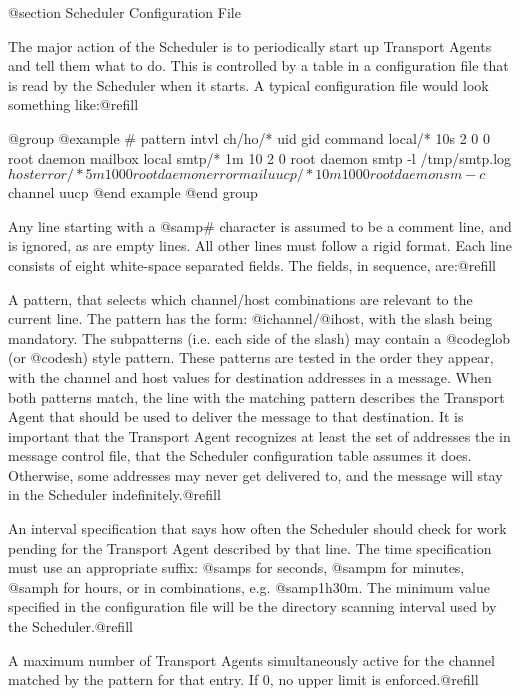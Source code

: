{{@section Scheduler Configuration File

The major action of the Scheduler is to periodically start up Transport
Agents and tell them what to do.  This is controlled by a table in a
configuration file that is read by the Scheduler when it starts.  A typical
configuration file would look something like:@refill

@group
@example
# pattern    intvl   ch/ho/* uid     gid     command
local/*      10s      2 0 0  root    daemon  mailbox local
smtp/*       1m      10 2 0  root    daemon  smtp -l /tmp/smtp.log $host
error/*      5m      10 0 0  root    daemon  errormail
uucp/*       10m     10 0 0  root    daemon  sm -c $channel uucp
@end example
@end group

Any line starting with a @samp{#} character is assumed to be a comment
line, and is ignored, as are empty lines.  All other lines must follow a
rigid format.  Each line consists of eight white-space separated fields.
The fields, in sequence, are:@refill

A pattern, that selects which channel/host combinations are relevant to the
current line.  The pattern has the form: @i{channel}/@i{host}, with the slash
being mandatory.  The subpatterns (i.e. each side of the slash) may contain a
@code{glob} (or @code{sh}) style pattern.  These patterns are tested in the
order they appear, with the channel and host values for destination addresses
in a message.  When both patterns match, the line with the matching pattern
describes the Transport Agent that should be used to deliver the message to
that destination.  It is important that the Transport Agent recognizes at
least the set of addresses the in message control file, that the Scheduler
configuration table assumes it does.  Otherwise, some addresses may never
get delivered to, and the message will stay in the Scheduler
indefinitely.@refill

An interval specification that says how often the Scheduler should check for
work pending for the Transport Agent described by that line.  The time
specification must use an appropriate suffix: @samp{s} for seconds, @samp{m}
for minutes, @samp{h} for hours, or in combinations, e.g. @samp{1h30m}.
The minimum value specified in the configuration file will be the directory
scanning interval used by the Scheduler.@refill

A maximum number of Transport Agents simultaneously active for the channel
matched by the pattern for that entry.  If 0, no upper limit is enforced.@refill

}}
